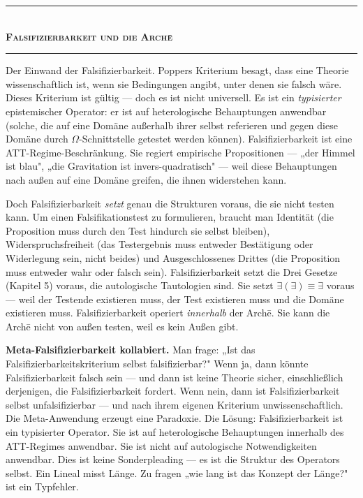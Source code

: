 \documentclass[10pt, openany, oneside]{book}
\renewcommand{\normalsize}{\fontsize{10}{13}\selectfont}
\begin{document}
\vspace{1.5em}


\begin{center}
    \rule{0.3\textwidth}{0.4pt}\\[0.5em]
    {\normalsize\bfseries\scshape Falsifizierbarkeit und die Arch\={e}}\\[0.3em]
    \rule{0.3\textwidth}{0.4pt}
\end{center}

\vspace{1em}

\noindent Der Einwand der Falsifizierbarkeit. Poppers Kriterium besagt, dass eine Theorie wissenschaftlich ist, wenn sie Bedingungen angibt, unter denen sie falsch wäre. Dieses Kriterium ist gültig --- doch es ist nicht universell. Es ist ein \textit{typisierter} epistemischer Operator: er ist auf heterologische Behauptungen anwendbar (solche, die auf eine Domäne außerhalb ihrer selbst referieren und gegen diese Domäne durch $\Omega$-Schnittstelle getestet werden können). Falsifizierbarkeit ist eine ATT-Regime-Beschränkung. Sie regiert empirische Propositionen --- „der Himmel ist blau", „die Gravitation ist invers-quadratisch" --- weil diese Behauptungen nach außen auf eine Domäne greifen, die ihnen widerstehen kann.

Doch Falsifizierbarkeit \textit{setzt} genau die Strukturen voraus, die sie nicht testen kann. Um einen Falsifikationstest zu formulieren, braucht man Identität (die Proposition muss durch den Test hindurch sie selbst bleiben), Widerspruchsfreiheit (das Testergebnis muss entweder Bestätigung oder Widerlegung sein, nicht beides) und Ausgeschlossenes Drittes (die Proposition muss entweder wahr oder falsch sein). Falsifizierbarkeit setzt die Drei Gesetze (Kapitel 5) voraus, die autologische Tautologien sind. Sie setzt $\exists(\exists) \equiv \exists$ voraus --- weil der Testende existieren muss, der Test existieren muss und die Domäne existieren muss. Falsifizierbarkeit operiert \textit{innerhalb} der Arch\={e}. Sie kann die Arch\={e} nicht von außen testen, weil es kein Außen gibt.

\textbf{Meta-Falsifizierbarkeit kollabiert.} Man frage: „Ist das Falsifizierbarkeitskriterium selbst falsifizierbar?" Wenn ja, dann könnte Falsifizierbarkeit falsch sein --- und dann ist keine Theorie sicher, einschließlich derjenigen, die Falsifizierbarkeit fordert. Wenn nein, dann ist Falsifizierbarkeit selbst unfalsifizierbar --- und nach ihrem eigenen Kriterium unwissenschaftlich. Die Meta-Anwendung erzeugt eine Paradoxie. Die Lösung: Falsifizierbarkeit ist ein typisierter Operator. Sie ist auf heterologische Behauptungen innerhalb des ATT-Regimes anwendbar. Sie ist nicht auf autologische Notwendigkeiten anwendbar. Dies ist keine Sonderpleading --- es ist die Struktur des Operators selbst. Ein Lineal misst Länge. Zu fragen „wie lang ist das Konzept der Länge?" ist ein Typfehler.
\end{document}
